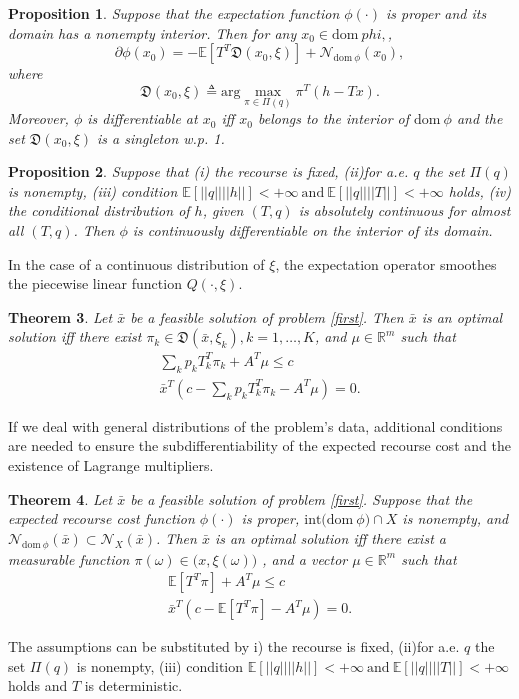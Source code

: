 \documentclass[a4pper,11pt]{article}
\newtheorem{thm}{Theorem}[section]
\newtheorem{prop}[thm]{Proposition}
\begin{document}
\begin{prop}
    Suppose that the expectation function $\phi(\cdot)$ is proper and its domain has a nonempty interior. Then for any $x_0\in \text{dom}\ phi,$,
    $$\partial \phi(x_0)=-\mathbb E[T^T\mathfrak D(x_0,\xi)]+\mathcal N_{\text{dom}\ \phi} (x_0),$$
    where
    $$\mathfrak D(x_0,\xi) \triangleq \text{arg}\max_{\pi\in \Pi(q)}\pi^T(h-Tx).$$
    Moreover, $\phi$ is differentiable at $x_0$ iff $x_0$ belongs to the interior of $\text{dom} \ \phi$ and the set $\mathfrak D(x_0,\xi)$ is a singleton w.p. 1.
\end{prop}
\begin{prop}
    Suppose that (i) the recourse is ﬁxed, (ii)for a.e. $q$ the set $\Pi(q)$ is nonempty, (iii) condition $\mathbb E[||q||||h||]<+\infty \ \text{and} \ \mathbb E[||q||||T||]<+\infty$ holds, (iv) the conditional distribution of $h$, given $(T,q)$ is absolutely continuous for almost all $(T,q)$. Then $\phi$ is continuously differentiable on the interior of its domain.
\end{prop}
In the case of a continuous distribution of $\xi$, the expectation operator smoothes the piecewise linear function $Q(\cdot, \xi)$.

\begin{thm}
    Let $\bar x$ be a feasible solution of problem \eqref{first}. Then $\bar x$ is an optimal solution iff there exist $\pi_k \in\mathfrak D(\bar x,\xi_k), k=1,\dots, K$, and $\mu\in \mathbb R^m$ such that
    \begin{equation}
        \begin{aligned}
            \sum_{k} p_kT_k^T\pi_k+A^T\mu\leq c
            \\
            \bar x^T(c-\sum_{k} p_kT_k^T\pi_k-A^T\mu)=0.
        \end{aligned}
    \end{equation}
\end{thm}

If we deal with general distributions of the problem’s data, additional conditions are needed to ensure the subdifferentiability of the expected recourse cost and the existence of Lagrange multipliers.
\begin{thm}
    Let $\bar x$ be a feasible solution of problem \eqref{first}. Suppose that the expected recourse cost function $\phi(\cdot)$ is proper, $\text{int(dom}\ \phi) \cap X$ is nonempty, and $\mathcal N_{\text{dom} \ \phi}  (\bar x) \subset \mathcal N_X (\bar x)$. Then $\bar x$ is an optimal solution iff there exist a measurable function $\pi(\omega)\in \mathfrak (x,\xi(\omega))$ , and a vector $\mu\in \mathbb R^m$ such that
    \begin{equation}
        \begin{aligned}
            \mathbb E[T^T\pi]+A^T\mu\leq c
            \\
            \bar x^T(c-\mathbb E[T^T\pi]-A^T\mu)=0.
        \end{aligned}
    \end{equation}
\end{thm}

The assumptions can be substituted by i) the recourse is ﬁxed, (ii)for a.e. $q$ the set $\Pi(q)$ is nonempty, (iii) condition $\mathbb E[||q||||h||]<+\infty \ \text{and} \ \mathbb E[||q||||T||]<+\infty$ holds and $T$ is deterministic.
\end{document}
